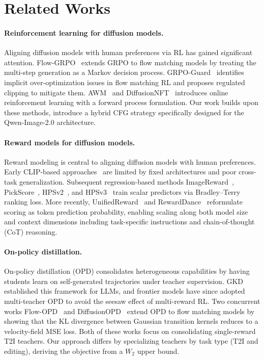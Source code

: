 \documentclass{article} %
\begin{document}
\section{Related Works}

\paragraph{Reinforcement learning for diffusion models.}
Aligning diffusion models with human preferences via RL has gained significant attention. Flow-GRPO~\citep{liu2025flowgrpo} extends GRPO to flow matching models by treating the multi-step generation as a Markov decision process. GRPO-Guard~\citep{wang2025grpo} identifies implicit over-optimization issues in flow matching RL and proposes regulated clipping to mitigate them. AWM~\citep{xue2025advantage} and DiffusionNFT~\citep{zheng2025diffusionnft} introduces online reinforcement learning with a forward process formulation. Our work builds upon these methods, introduce a hybrid CFG strategy specifically designed for the Qwen-Image-2.0 architecture.

\paragraph{Reward models for diffusion models.}
Reward modeling is central to aligning diffusion models with human preferences. Early CLIP-based approaches~\citep{clip} are limited by fixed architectures and poor cross-task generalization. Subsequent regression-based methods ImageReward~\citep{xu2023imagereward}, PickScore~\citep{kirstain2023pick}, HPSv2~\citep{wu2023human}, and HPSv3~\citep{ma2025hpsv3} train scalar predictors via Bradley--Terry ranking loss. More recently, UnifiedReward~\citep{wang2025unified,wang2026unified} and RewardDance~\citep{wu2025rewarddance} reformulate scoring as token prediction probability, enabling scaling along both model size and context dimensions including task-specific instructions and chain-of-thought (CoT) reasoning. 

\paragraph{On-policy distillation.}
On-policy distillation (OPD) consolidates heterogeneous capabilities by having students learn on self-generated trajectories under teacher supervision. GKD~\citep{agarwal2024policy} established this framework for LLMs, and frontier models have since adopted multi-teacher OPD to avoid the seesaw effect of multi-reward RL. Two concurrent works Flow-OPD~\citep{fang2026flow} and DiffusionOPD~\citep{li2026diffusionopd} extend OPD to flow matching models by showing that the KL divergence between Gaussian transition kernels reduces to a velocity-field MSE loss. Both of these works focus on consolidating single-reward T2I teachers. Our approach differs by specializing teachers by task type (T2I and editing), deriving the objective from a $W_2$ upper bound.
\end{document}

